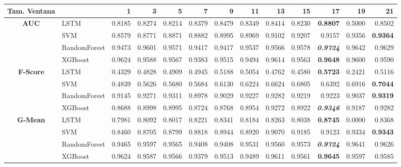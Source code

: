 \begin{table}[H]
	\centering
	\begin{adjustbox}{max width=12cm}
		\begin{tabular}{|c|l|r|r|r|r|r|r|r|r|r|r|r|}
			\hline
			\textbf{Tam. Ventana}&         &      1  &      3  &      5  &      7  &      9  &      11 &      13 &      15 &      17 &      19 &      21 \\
			\hline
			\textbf{AUC} &  LSTM &  0.8185 &  0.8274 &  0.8214 &  0.8379 &  0.8479 &  0.8349 &  0.8414 &  0.8230 & \textbf{  0.8807 } &  0.5000 &  0.8502 \\
			&  SVM &  0.8579 &  0.8771 &  0.8871 &  0.8882 &  0.8995 &  0.8969 &  0.9102 &  0.9207 &  0.9157 &  0.9356 & \textbf{  0.9364 } \\
			&  RandomForest &  0.9473 &  0.9601 &  0.9571 &  0.9417 &  0.9417 &  0.9537 &  0.9566 &  0.9578 & \textit{ \textbf{  0.9724 } } &  0.9642 &  0.9629 \\
			&  XGBoost &  0.9624 &  0.9588 &  0.9567 &  0.9383 &  0.9515 &  0.9494 &  0.9614 &  0.9563 & \textbf{  0.9648 } &  0.9600 &  0.9590 \\
			\hline
			\textbf{F-Score} &  LSTM &  0.4329 &  0.4828 &  0.4909 &  0.4945 &  0.5188 &  0.5054 &  0.4762 &  0.4580 & \textbf{  0.5723 } &  0.2421 &  0.5116 \\
			&  SVM &  0.4839 &  0.5626 &  0.5680 &  0.5684 &  0.6130 &  0.6224 &  0.6624 &  0.6805 &  0.6392 &  0.6916 & \textbf{  0.7044 } \\
			&  RandomForest &  0.9145 &  0.9271 &  0.9311 &  0.8978 &  0.9029 &  0.9227 &  0.9282 &  0.9219 &  0.9223 &  0.9037 & \textbf{  0.9319 } \\
			&  XGBoost &  0.8688 &  0.8998 &  0.8995 &  0.8724 &  0.8768 &  0.8954 &  0.9272 &  0.8922 & \textit{ \textbf{  0.9346 } } &  0.9187 &  0.9282 \\
			\hline
			\textbf{G-Mean} &  LSTM &  0.7981 &  0.8092 &  0.8017 &  0.8221 &  0.8341 &  0.8184 &  0.8263 &  0.8038 & \textbf{  0.8745 } &  0.0000 &  0.8368 \\
			&  SVM &  0.8460 &  0.8705 &  0.8799 &  0.8818 &  0.8944 &  0.8920 &  0.9070 &  0.9185 &  0.9123 &  0.9334 & \textbf{  0.9343 } \\
			&  RandomForest &  0.9465 &  0.9597 &  0.9565 &  0.9408 &  0.9408 &  0.9531 &  0.9560 &  0.9573 & \textit{ \textbf{  0.9724 } } &  0.9641 &  0.9626 \\
			&  XGBoost &  0.9624 &  0.9587 &  0.9566 &  0.9379 &  0.9513 &  0.9489 &  0.9611 &  0.9561 & \textbf{  0.9645 } &  0.9597 &  0.9585 \\

\end{tabular}
\end{adjustbox}
\end{table}
